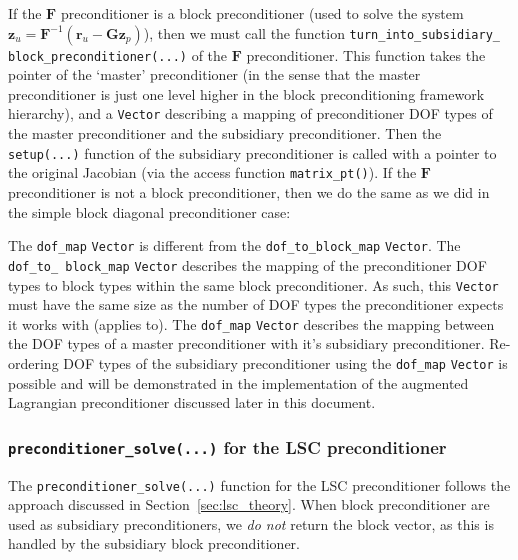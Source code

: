 If the $\mathbf{F}$ preconditioner is a block preconditioner (used to solve the
system $\mathbf{z}_u = \mathbf{F}^{-1} \left( \mathbf{r}_u - \mathbf{G}
  \mathbf{z}_p \right)$), then we must call the function
\texttt{turn\_\allowbreak into\_\allowbreak subsidiary\_\allowbreak
  block\_\allowbreak preconditioner(...)} of the $\mathbf{F}$ preconditioner.
This function takes the pointer of the `master' preconditioner (in the sense
that the master preconditioner is just one level higher in the block
preconditioning framework hierarchy), and a \texttt{Vector} describing a
mapping of preconditioner DOF types of the master preconditioner and the
subsidiary preconditioner. Then the \texttt{setup(...)} function of the
subsidiary preconditioner is called with a pointer to the original Jacobian
(via the access function \texttt{matrix\_\allowbreak pt()}). If the
$\mathbf{F}$ preconditioner is not a block preconditioner, then we do the same
as we did in the simple block diagonal preconditioner case:

The \texttt{dof\_\allowbreak map} \texttt{Vector} is different from the
\texttt{dof\_\allowbreak to\_\allowbreak block\_\allowbreak map}
\texttt{Vector}.  The \texttt{dof\_\allowbreak to\_\allowbreak
  block\_\allowbreak map} \texttt{Vector} describes the mapping of the
preconditioner DOF types to block types within the same block preconditioner.
As such, this \texttt{Vector} must have the same size as the number of DOF
types the preconditioner expects it works with (applies to). The
\texttt{dof\_\allowbreak map} \texttt{Vector} describes the mapping between the
DOF types of a master preconditioner with it's subsidiary preconditioner.
Re-ordering DOF types of the subsidiary preconditioner using the
\texttt{dof\_\allowbreak map} \texttt{Vector} is possible and will be
demonstrated in the implementation of the augmented Lagrangian preconditioner
discussed later in this document.


\subsubsection{\texttt{preconditioner\_solve(...)} for the LSC preconditioner\label{sec:lsc_implementation_precsolve}}
The \texttt{preconditioner\_\allowbreak solve(...)} function for the LSC
preconditioner follows the approach discussed in Section~\ref{sec:lsc_theory}.
When block preconditioner are used as subsidiary preconditioners, we \emph{do not}
return the block vector, as this is handled by the subsidiary block
preconditioner.



